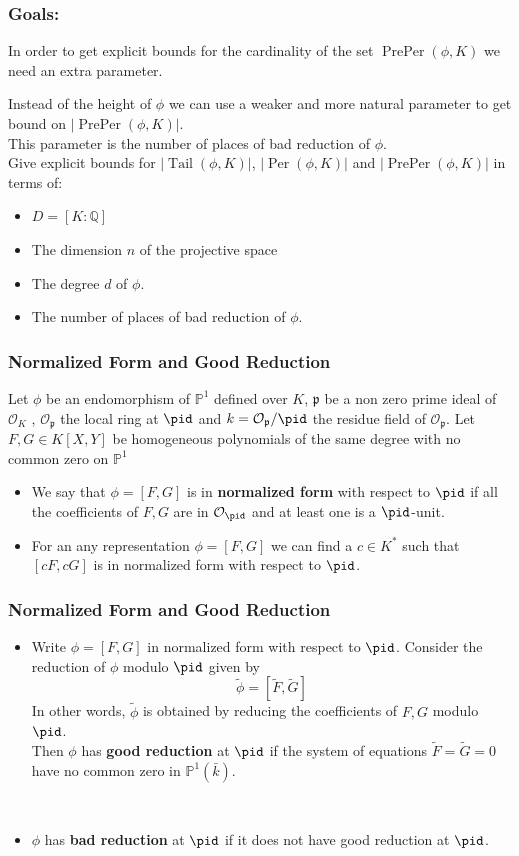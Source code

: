\documentclass{beamer}
\def\jump{ \quad \\ \vspace{0.7cm} \pause}
\def\PP{{\mathbb P}}
\def\QQ{{\mathbb Q}}
\DeclareMathOperator{\Tail}{Tail}
\DeclareMathOperator{\Per}{Per}
\DeclareMathOperator{\PrePer}{PrePer}
\theoremstyle{thmstyle}
\theoremstyle{thmstyle}
\theoremstyle{mystyle}
\theoremstyle{qstnstyle}
\begin{document}
\begin{frame}
\frametitle{Goals:}

In order to get explicit bounds for the cardinality of the set $\PrePer(\phi,K)$ we need an extra parameter. 

Instead of the height of $\phi$ we can use a weaker and more natural parameter to get bound on $|\PrePer(\phi,K)|$.\pause 
\jump
This parameter is the number of places of bad reduction of $\phi$.
\jump
Give explicit bounds for $|\Tail(\phi,K)|$, $|\Per(\phi,K)|$ and $|\PrePer(\phi,K)|$ in terms of:
\begin{itemize}
\item  $D=[K: \QQ]$ 

\item The dimension $n$ of the projective space  

\item The degree $d$ of $\phi$.

\item The number of places of bad reduction of $\phi$.
\end{itemize}


\end{frame}

\begin{frame}
\frametitle{Normalized Form and Good Reduction}
Let $\phi$ be an endomorphism of $\PP^1$ defined over $K$, $\mathfrak{p}$ be a non zero prime ideal of $\mathcal{O}_K$
, $\mathcal{O}_{\mathfrak{p}}$ the local ring at $\pid$ and $k=\mathcal{O}_{\mathfrak{p}}/\pid$ the residue field of $\mathcal{O}_{\mathfrak{p}}$. Let $F,G \in K[X,Y]$ be homogeneous polynomials of the same degree with no common zero on $\PP^1$ \jump


\begin{itemize}
\item We say that $\phi=[F, G]$ is in  \textbf{normalized form} with respect to $\pid$ if  all the coefficients of $F,G$ are in $\mathcal{O}_\pid$ and at least one is a $\pid$-unit. \jump
\item For an any representation $\phi=[F, G]$ we can find a $c\in K^{*}$ such that $[cF,cG]$ is in normalized form with respect to $\pid$.
\end{itemize}
\end{frame}

\begin{frame}
\frametitle{Normalized Form and Good Reduction}

\begin{itemize}
\item Write $\phi=[F, G]$ in normalized form with respect to $\pid$. Consider the reduction of $\phi$ modulo $\pid$ given by
$$\tilde{\phi}=[\tilde{F},\tilde{G}] $$
In other words, $\tilde{\phi}$ is obtained by reducing the coefficients of $F,G$ modulo $\pid$.
\jump
Then $\phi$ has \textbf{good reduction} at $\pid$ if the system of equations $\tilde{F}=\tilde{G}=0$ have no common zero in $\mathbb{P}^1(\bar{k})$.

\jump
\item $\phi$ has \textbf{bad reduction} at $\pid$ if it does not have good reduction at $\pid$.
\end{itemize}
\end{frame}
\end{document}
